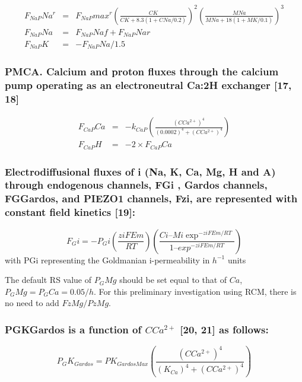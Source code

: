 \documentclass[a4paper]{article}
\newcommand{\med}[1]{M#1}
\newcommand{\cell}[1]{C#1}
\newcommand{\MNa}{\med{Na}}
\newcommand{\MK}{\med{K}}
\newcommand{\KCa}{K_{Ca}}
\newcommand{\CNa}{\cell{Na}}
\newcommand{\CK}{\cell{K}}
\newcommand{\CCatp}{\cell{Ca^{2+}}}
\newcommand{\CCa}{\cell{Ca}}
\newcommand{\F}[2]{F_{#1}#2}
\newcommand{\kk}[2]{k_{#1}#2}
\begin{document}
\begin{eqnarray}
\F{NaP}{Na}^r  &=& \F{NaP}{max}^r\left(\frac{\CK}{\CK + 8.3(1 + \CNa/0.2)}\right)^2\left(\frac{\MNa}{\MNa + 18(1 + \MK/0.1)}\right)^3 \\
\F{NaP}{Na} &=& \F{NaP}{Naf} + \F{NaP}{Nar} \\
\F{NaP}{K} &=& -\F{NaP}{Na}/1.5
\end{eqnarray}

\subsubsection{PMCA. Calcium and proton fluxes through the calcium pump operating as an electroneutral Ca:2H exchanger  [17, 18]}

\setcounter{equation}{0}
\renewcommand{\theequation}{12.\alph{equation}}

\begin{eqnarray}
\F{CaP}{Ca} &=& -\kk{CaP}{}\left(\frac{(\CCatp)^4}{(0.0002)^4 + (\CCa^{2+})^4}\right)\\
\F{CaP}{H} &=& -2\times\F{CaP}{Ca}
\end{eqnarray}

\subsubsection{Electrodiffusional fluxes of i (Na, K, Ca, Mg, H and A) through endogenous channels, FGi , Gardos channels, FGGardos, and PIEZO1 channels, Fzi, are represented with constant field kinetics [19]: }

\setcounter{equation}{12}
\renewcommand{\theequation}{\arabic{equation}}
\begin{equation}
\F{G}{i} = -P_{G}i\left(\frac{ziFEm}{RT}\right)\left(\frac{Ci – Mi\exp^{-ziFEm/RT}}{1 – exp^{-ziFEm/RT}}\right)
\end{equation}
with PGi representing the Goldmanian i-permeability in $h^{-1}$ units

The default RS value of $P_{G}Mg$ should be set equal to that of $Ca$, $P_{G}Mg = P_{G}Ca = 0.05/h$. For this preliminary investigation using RCM, there is no need to add $FzMg/PzMg$.

\subsubsection{PGKGardos is a function of $CCa^{2+}$ [20, 21] as follows:}
\begin{equation}
P_{G}K_{Gardos} = PK_{GardosMax}\left(\frac{(\CCatp)^4}{(\KCa)^4 + (\CCatp)^4}\right)
\end{equation}
\end{document}
